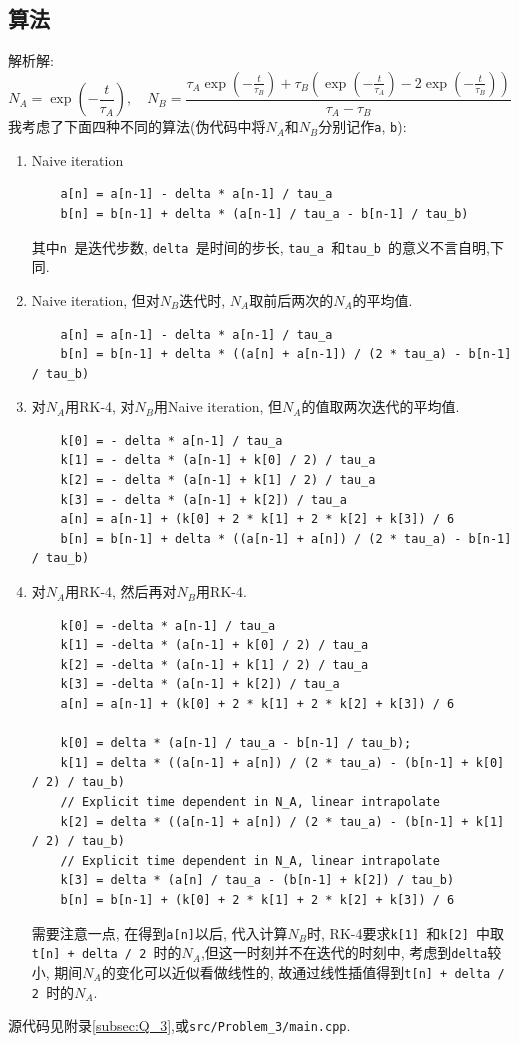 \documentclass[UTF-8]{article}
\begin{document}
\subsection{算法}
解析解: 
\begin{equation}
	N_A=\exp(-\frac{t}{\tau_{A}}),\quad N_B=\frac{\tau_{A}\exp(-\frac{t}{\tau_{B}})+\tau_{B}(\exp(-\frac{t}{\tau_{A}})-2\exp(-\frac{t}{\tau_{B}}))}{\tau_{A}-\tau_{B}}
\end{equation}
我考虑了下面四种不同的算法(伪代码中将$N_A$和$N_B$分别记作\texttt{a}, \texttt{b}): 
\begin{enumerate}
\item Naive iteration
\begin{lstlisting}
	a[n] = a[n-1] - delta * a[n-1] / tau_a
	b[n] = b[n-1] + delta * (a[n-1] / tau_a - b[n-1] / tau_b)
\end{lstlisting}
其中\texttt{n }是迭代步数, \texttt{delta }是时间的步长, \texttt{tau\_a }和\texttt{tau\_b }的意义不言自明,下同.
\item Naive iteration, 但对$N_B$迭代时, $N_A$取前后两次的$N_A$的平均值.
\begin{lstlisting}
	a[n] = a[n-1] - delta * a[n-1] / tau_a
	b[n] = b[n-1] + delta * ((a[n] + a[n-1]) / (2 * tau_a) - b[n-1] / tau_b)
\end{lstlisting}
\item 对$N_A$用RK-4, 对$N_B$用Naive iteration, 但$N_A$的值取两次迭代的平均值.
\begin{lstlisting}
	k[0] = - delta * a[n-1] / tau_a
	k[1] = - delta * (a[n-1] + k[0] / 2) / tau_a
	k[2] = - delta * (a[n-1] + k[1] / 2) / tau_a
	k[3] = - delta * (a[n-1] + k[2]) / tau_a
	a[n] = a[n-1] + (k[0] + 2 * k[1] + 2 * k[2] + k[3]) / 6
	b[n] = b[n-1] + delta * ((a[n-1] + a[n]) / (2 * tau_a) - b[n-1] / tau_b)
\end{lstlisting}
\item 对$N_A$用RK-4, 然后再对$N_B$用RK-4.
\begin{lstlisting}
	k[0] = -delta * a[n-1] / tau_a
	k[1] = -delta * (a[n-1] + k[0] / 2) / tau_a
	k[2] = -delta * (a[n-1] + k[1] / 2) / tau_a
	k[3] = -delta * (a[n-1] + k[2]) / tau_a
	a[n] = a[n-1] + (k[0] + 2 * k[1] + 2 * k[2] + k[3]) / 6

	k[0] = delta * (a[n-1] / tau_a - b[n-1] / tau_b);
	k[1] = delta * ((a[n-1] + a[n]) / (2 * tau_a) - (b[n-1] + k[0] / 2) / tau_b)
	// Explicit time dependent in N_A, linear intrapolate
	k[2] = delta * ((a[n-1] + a[n]) / (2 * tau_a) - (b[n-1] + k[1] / 2) / tau_b)
	// Explicit time dependent in N_A, linear intrapolate
	k[3] = delta * (a[n] / tau_a - (b[n-1] + k[2]) / tau_b)
	b[n] = b[n-1] + (k[0] + 2 * k[1] + 2 * k[2] + k[3]) / 6
\end{lstlisting}
需要注意一点, 在得到\texttt{a[n]}以后, 代入计算$N_B$时, RK-4要求\texttt{k[1] }和\texttt{k[2] }中取\\ \texttt{t[n] + delta / 2 }时的$N_A$,但这一时刻并不在迭代的时刻中, 考虑到\texttt{delta}较小, 期间$N_A$的变化可以近似看做线性的, 故通过线性插值得到\texttt{t[n] + delta / 2 }时的$N_A$.
\end{enumerate}
源代码见附录\ref{subsec:Q_3},或\texttt{src/Problem\_3/main.cpp}.
\end{document}
